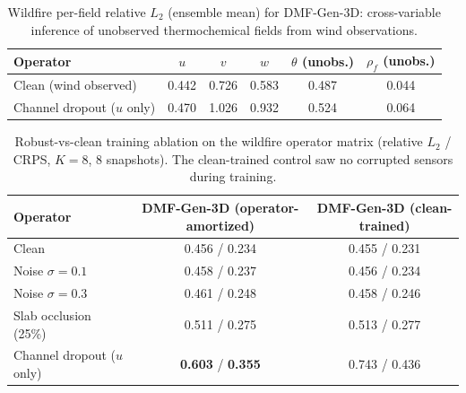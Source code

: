 \documentclass{article} %
\newcommand{\model}{DMF-Gen-3D}
\begin{document}
\begin{table}[h]
\caption{Wildfire per-field relative $L_2$ (ensemble mean) for \model{}: cross-variable inference of unobserved thermochemical fields from wind observations.}
\label{tab:crossvar}
\begin{center}
\small
\begin{tabular}{lccccc}
\toprule
Operator & $u$ & $v$ & $w$ & $\theta$ (unobs.) & $\rho_f$ (unobs.) \\
\midrule
Clean (wind observed) & 0.442 & 0.726 & 0.583 & 0.487 & 0.044 \\
Channel dropout ($u$ only) & 0.470 & 1.026 & 0.932 & 0.524 & 0.064 \\
\bottomrule
\end{tabular}
\end{center}
\end{table}

\begin{table}[h]
\caption{Robust-vs-clean training ablation on the wildfire operator matrix (relative $L_2$ / CRPS, $K{=}8$, 8 snapshots). The clean-trained control saw no corrupted sensors during training.}
\label{tab:robustclean}
\begin{center}
\small
\begin{tabular}{lcc}
\toprule
Operator & \model{} (operator-amortized) & \model{} (clean-trained) \\
\midrule
Clean & 0.456 / 0.234 & 0.455 / 0.231 \\
Noise $\sigma{=}0.1$ & 0.458 / 0.237 & 0.456 / 0.234 \\
Noise $\sigma{=}0.3$ & 0.461 / 0.248 & 0.458 / 0.246 \\
Slab occlusion (25\%) & 0.511 / 0.275 & 0.513 / 0.277 \\
Channel dropout ($u$ only) & \textbf{0.603} / \textbf{0.355} & 0.743 / 0.436 \\
\bottomrule
\end{tabular}
\end{center}
\end{table}
\end{document}
